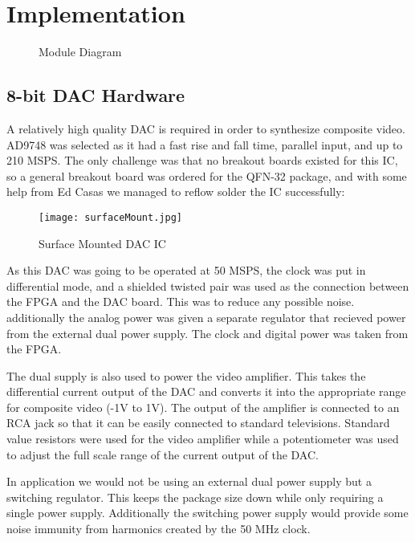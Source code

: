 \section{Implementation}

\begin{figure}[H]
    \centering
    \caption{Module Diagram}
\end{figure}

\subsection{8-bit DAC Hardware}

A relatively high quality DAC is required in order to synthesize composite
video. AD9748 was selected as it had a fast rise and fall time, parallel input,
and up to 210 MSPS. The only challenge was that no breakout boards existed for
this IC, so a general breakout board was ordered for the QFN-32 package, and
with some help from Ed Casas we managed to reflow solder the IC successfully:

\begin{figure}[H]
    \centering
    \texttt{[image: surfaceMount.jpg]}
    \caption{Surface Mounted DAC IC}
\end{figure}

As this DAC was going to be operated at 50 MSPS, the clock was put in
differential mode, and a shielded twisted pair was used as the connection
between the FPGA and the DAC board. This was to reduce any possible noise.
additionally the analog power was given a separate regulator that recieved
power from the external dual power supply. The clock and digital power was taken
from the FPGA.

The dual supply is also used to power the video amplifier. This takes the
differential current output of the DAC and converts it into the appropriate
range for composite video (-1V to 1V). The output of the amplifier is connected
to an RCA jack so that it can be easily connected to standard televisions.
Standard value resistors were used for the video amplifier while a potentiometer
was used to adjust the full scale range of the current output of the DAC.

In application we would not be using an external dual power supply but a switching
regulator. This keeps the package size down while only requiring a single power
supply. Additionally the switching power supply would provide some noise
immunity from harmonics created by the 50 MHz clock.

